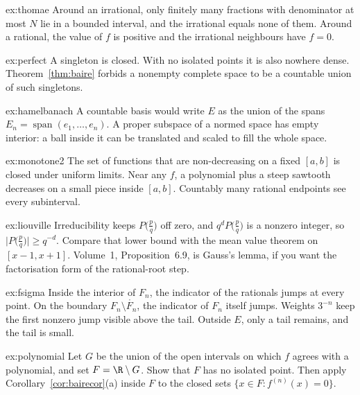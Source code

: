 \begin{hint}{ex:thomae}
Around an irrational, only finitely many fractions with denominator at most $N$ lie in a bounded interval, and the irrational equals none of them. Around a rational, the value of $f$ is positive and the irrational neighbours have $f=0$.
\end{hint}
\begin{hint}{ex:perfect}
A singleton is closed. With no isolated points it is also nowhere dense. Theorem~\ref{thm:baire} forbids a nonempty complete space to be a countable union of such singletons.
\end{hint}
\begin{hint}{ex:hamelbanach}
A countable basis would write $E$ as the union of the spans $E_n=\operatorname{span}(e_1,\dots,e_n)$. A proper subspace of a normed space has empty interior: a ball inside it can be translated and scaled to fill the whole space.
\end{hint}
\begin{hint}{ex:monotone2}
The set of functions that are non-decreasing on a fixed $[a,b]$ is closed under uniform limits. Near any $f$, a polynomial plus a steep sawtooth decreases on a small piece inside $[a,b]$. Countably many rational endpoints see every subinterval.
\end{hint}
\begin{hint}{ex:liouville}
Irreducibility keeps $P\bigl(\frac pq\bigr)$ off zero, and $q^d P\bigl(\frac pq\bigr)$ is a nonzero integer, so $\bigl|P\bigl(\frac pq\bigr)\bigr|\ge q^{-d}$. Compare that lower bound with the mean value theorem on $[x-1,x+1]$. Volume~1, Proposition~6.9, is Gauss's lemma, if you want the factorisation form of the rational-root step.
\end{hint}
\begin{hint}{ex:fsigma}
Inside the interior of $F_n$, the indicator of the rationals jumps at every point. On the boundary $F_n\setminus\mathring{F_n}$, the indicator of $F_n$ itself jumps. Weights $3^{-n}$ keep the first nonzero jump visible above the tail. Outside $E$, only a tail remains, and the tail is small.
\end{hint}
\begin{hint}{ex:polynomial}
Let $G$ be the union of the open intervals on which $f$ agrees with a polynomial, and set $F=\R\setminus G$. Show that $F$ has no isolated point. Then apply Corollary~\ref{cor:bairecor}(a) inside $F$ to the closed sets $\{x\in F:f^{(n)}(x)=0\}$.
\end{hint}

